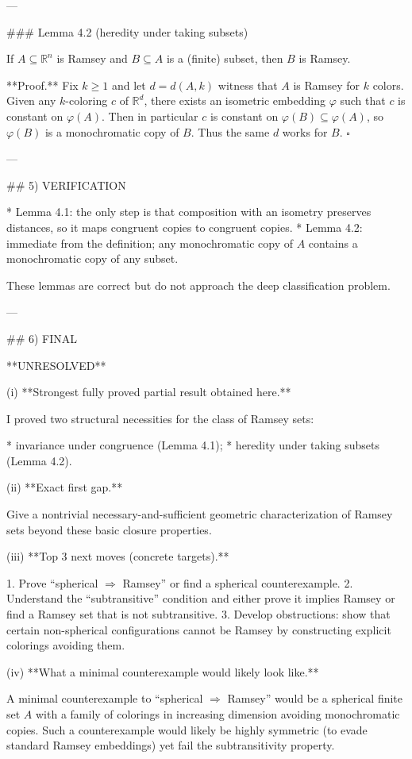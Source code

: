 ---

### Lemma 4.2 (heredity under taking subsets)

If $A\subseteq\mathbb R^n$ is Ramsey and $B\subseteq A$ is a (finite) subset, then $B$ is Ramsey.

**Proof.**
Fix $k\ge 1$ and let $d=d(A,k)$ witness that $A$ is Ramsey for $k$ colors.
Given any $k$-coloring $c$ of $\mathbb R^d$, there exists an isometric embedding $\varphi$ such that $c$ is constant on $\varphi(A)$.
Then in particular $c$ is constant on $\varphi(B)\subseteq \varphi(A)$, so $\varphi(B)$ is a monochromatic copy of $B$.
Thus the same $d$ works for $B$.
$\square$

---

## 5) VERIFICATION

* Lemma 4.1: the only step is that composition with an isometry preserves distances, so it maps congruent copies to congruent copies.
* Lemma 4.2: immediate from the definition; any monochromatic copy of $A$ contains a monochromatic copy of any subset.

These lemmas are correct but do not approach the deep classification problem.

---

## 6) FINAL

**UNRESOLVED**

(i) **Strongest fully proved partial result obtained here.**

I proved two structural necessities for the class of Ramsey sets:

* invariance under congruence (Lemma 4.1);
* heredity under taking subsets (Lemma 4.2).

(ii) **Exact first gap.**

Give a nontrivial necessary-and-sufficient geometric characterization of Ramsey sets beyond these basic closure properties.

(iii) **Top 3 next moves (concrete targets).**

1. Prove “spherical $\Rightarrow$ Ramsey” or find a spherical counterexample.
2. Understand the “subtransitive” condition and either prove it implies Ramsey or find a Ramsey set that is not subtransitive.
3. Develop obstructions: show that certain non-spherical configurations cannot be Ramsey by constructing explicit colorings avoiding them.

(iv) **What a minimal counterexample would likely look like.**

A minimal counterexample to “spherical $\Rightarrow$ Ramsey” would be a spherical finite set $A$ with a family of colorings in increasing dimension avoiding monochromatic copies. Such a counterexample would likely be highly symmetric (to evade standard Ramsey embeddings) yet fail the subtransitivity property.



